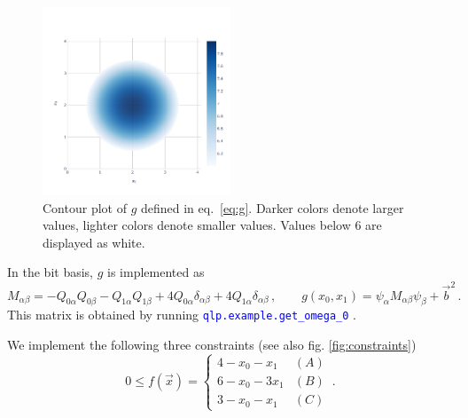 \documentclass[]{article}
\newcommand{\codeword}[1]{\texttt{\textcolor{blue}{\lstinline{#1}}}
}
\begin{document}
\begin{figure}
	\centering
	\includegraphics[width=0.5\textwidth]{contour-opt}
	\caption{
		\label{fig:g}
		Contour plot of $g$ defined in eq.~\eqref{eq:g}.
		Darker colors denote larger values, lighter colors denote smaller values.
		Values below $6$ are displayed as white.
	}
\end{figure}

In the bit basis, $g$ is implemented as
\begin{equation}
	M_{\alpha \beta}
        =
        - Q_{0\alpha}Q_{0\beta}
        - Q_{1\alpha}Q_{1\beta}
        + 4Q_{0\alpha}\delta_{\alpha\beta}
        + 4Q_{1\alpha}\delta_{\alpha\beta}
   \, , \qquad
   g(x_0, x_1) = \psi_\alpha M_{\alpha \beta} \psi_\beta + \vec b^2\, .
\end{equation}
This matrix is obtained by running \codeword{qlp.example.get_omega_0}.

We implement the following three constraints (see also fig. \ref{fig:constraints})
\begin{equation}
	\label{eq:constrained}
	0
	\leq
	f(\vec x)
	=
	\begin{cases}
		4 - x_0 - x_1 & (A) \\ 
		6 - x_0 - 3 x_1 & (B) \\
		3 - x_0 - x_1 & (C)
	\end{cases}
	\, .
\end{equation}
\end{document}
